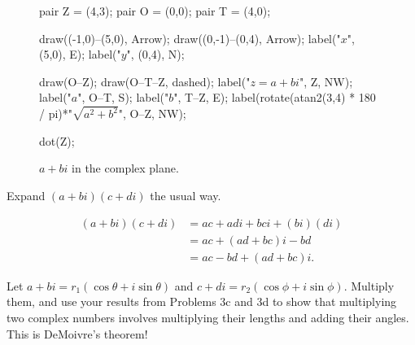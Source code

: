 \documentclass[../key.tex]{subfiles}
\begin{document}
\begin{figure}[h]
	\begin{center}
		\begin{minipage}{\textwidth}
			\centering
			\begin{asy}[width=0.5\textwidth]
				pair Z = (4,3);
				pair O = (0,0);
				pair T = (4,0);
				
				draw((-1,0)--(5,0), Arrow);
				draw((0,-1)--(0,4), Arrow);
				label("$x$", (5,0), E);
				label("$y$", (0,4), N);
				
				draw(O--Z);
				draw(O--T--Z, dashed);
				label("$z=a+bi$", Z, NW);
				label("$a$", O--T, S);
				label("$b$", T--Z, E);
				label(rotate(atan2(3,4) * 180 / pi)*"$\sqrt{a^2+b^2}$", O--Z, NW);
				
				dot(Z);
			\end{asy}
		\end{minipage}
	\end{center}

	\begin{center}
		\begin{minipage}{\textwidth}
			\caption{$a+bi$ in the complex plane.}
			\label{fig:a_plus_b_i}
		\end{minipage}
	\end{center}
	\vspace*{-2\baselineskip}
\end{figure}

\begin{inner_problem}
\item Expand $(a+bi)(c+di)$ the usual way.
\end{inner_problem}

\begin{align*}
(a+bi)(c+di)&=ac+adi+bci+(bi)(di) \\
&= ac + (ad + bc)i - bd \\
&= ac - bd + (ad + bc)i.
\end{align*}

\begin{inner_problem}
\item Let $a+bi=r_1(\cos\theta + i\sin\theta)$ and $c+di=r_2(\cos\phi + i\sin\phi)$. Multiply them, and use your results from Problems 3c and 3d to show that multiplying two complex numbers involves multiplying their lengths and adding their angles. This is DeMoivre's theorem!
\end{inner_problem}

\end{document}
